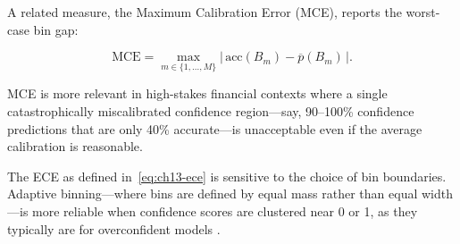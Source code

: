A related measure, the Maximum Calibration Error (MCE), reports the worst-case bin gap:

\begin{equation}
  \text{MCE} = \max_{m \in \{1,\ldots,M\}} \left|\, \text{acc}(B_m) -
  \overline{p}(B_m) \,\right|.
  \label{eq:ch13-mce}
\end{equation}

MCE is more relevant in high-stakes financial contexts where a single catastrophically
miscalibrated confidence region---say, 90--100\% confidence predictions that are only
40\% accurate---is unacceptable even if the average calibration is reasonable.

\begin{remark}
The ECE as defined in~\eqref{eq:ch13-ece} is sensitive to the choice of bin boundaries.
Adaptive binning---where bins are defined by equal mass rather than equal width---is
more reliable when confidence scores are clustered near 0 or 1, as they typically are
for overconfident models \cite{niculescu2005predicting}.
\end{remark}

